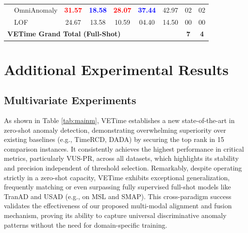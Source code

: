 \documentclass{article}
\theoremstyle{plain}
\theoremstyle{definition}
\theoremstyle{remark}
\begin{document}
\begin{table}[t!]
\begin{tabular}{l|l|ccccc|c|c}
    & OmniAnomaly & \textcolor{red}{\textbf{31.57}} & \textcolor{blue}{\textbf{18.58}} & \textcolor{red}{\textbf{28.07}} & \textcolor{blue}{\textbf{37.44}} & 42.97 & 02 & 02 \\
    & LOF & 24.67 & 13.58 & 10.59 & 04.40 & 14.50 & 00 & 00 \\
    \hline
    \multicolumn{7}{l}{\textbf{VETime Grand Total (Full-Shot)}} & \textbf{7} & \textbf{4} \\
    \hline
\end{tabular}
\end{table}

\section{Additional Experimental Results}\label{appendix:C}

\subsection{Multivariate Experiments}\label{appendix:C1}
As shown in Table \ref{tab:mainm}, VETime establishes a new state-of-the-art in zero-shot anomaly detection, demonstrating overwhelming superiority over existing baselines (e.g., TimeRCD, DADA) by securing the top rank in 15 comparison instances. It consistently achieves the highest performance in critical metrics, particularly VUS-PR, across all datasets, which highlights its stability and precision independent of threshold selection. Remarkably, despite operating strictly in a zero-shot capacity, VETime exhibits exceptional generalization, frequently matching or even surpassing fully supervised full-shot models like TranAD and USAD (e.g., on MSL and SMAP). This cross-paradigm success validates the effectiveness of our proposed multi-modal alignment and fusion mechanism, proving its ability to capture universal discriminative anomaly patterns without the need for domain-specific training.
\end{document}

